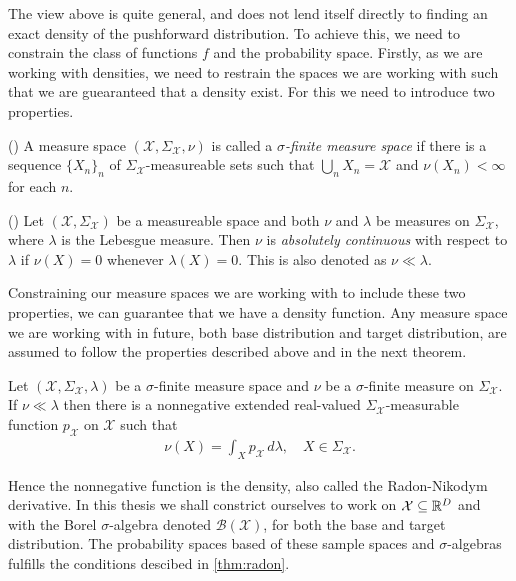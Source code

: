The view above is quite general, and does not lend itself directly to finding an exact density of the pushforward distribution.
To achieve this, we need to constrain the class of functions \(f\) and the probability space.
Firstly, as we are working with densities, we need to restrain the spaces we are working with
such that we are guearanteed that a density exist. For this we need to introduce two properties.
\begin{definition}(\cite{real_analysis})
    A measure space \((\mathcal{X},\Sigma_{\mathcal{X}}, \nu)\) is called a \emph{\(\sigma\)-finite measure space}
    if there is a sequence \(\{X_n\}_n\) of \(\Sigma_{\mathcal{X}}\)-measureable sets such that
    \(\bigcup\limits_n X_n = \mathcal{X}\) and \(\nu(X_n) < \infty\) for each \(n\).
\end{definition}
\begin{definition}(\cite{real_analysis})
    Let \((\mathcal{X}, \Sigma_{\mathcal{X}})\) be a measureable space and both \(\nu\) and
    \(\lambda\) be measures on \(\Sigma_{\mathcal{X}}\), where \(\lambda\) is the Lebesgue 
    measure. Then \(\nu\) is \emph{absolutely continuous} with respect to \(\lambda\) if
    \(\nu(X) = 0\) whenever \(\lambda(X) = 0\). This is also denoted as \(\nu \ll \lambda\). 
\end{definition}
Constraining our measure spaces we are working with to include these two properties, we can
guarantee that we have a density function. Any measure space we are working with in future,
both base distribution and target distribution, are assumed to follow the properties described
above and in the next theorem.
\begin{theorem}\label{thm:radon}
    Let \((\mathcal{X}, \Sigma_{\mathcal{X}}, \lambda)\) be a \(\sigma\)-finite measure space
    and \(\nu\) be a \(\sigma\)-finite measure on \(\Sigma_{\mathcal{X}}\). If \(\nu \ll \lambda\)
    then there is a nonnegative extended real-valued \(\Sigma_{\mathcal{X}}\)-measurable function
    \(p_{\mathcal{X}}\) on \(\mathcal{X}\) such that 
    \begin{align}
        \nu(X) = \int_X p_{\mathcal{X}}\, d\lambda,\quad X \in \Sigma_{\mathcal{X}}.
    \end{align}
\end{theorem}
Hence the nonnegative function is the density, also called the Radon-Nikodym derivative.
In this thesis we shall constrict ourselves to work on \(\mathcal{X} \subseteq \mathbb{R}^D\) and 
with the Borel \(\sigma\)-algebra denoted \(\mathscr{B}(\mathcal{X})\), for both the base
and target distribution. The probability spaces based of these sample spaces and \(\sigma\)-algebras 
fulfills the conditions descibed in \cref{thm:radon}.

